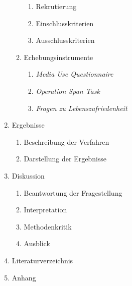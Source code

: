 \begin{enumerate}
\begin{enumerate}
\begin{enumerate}
            \item Rekrutierung
            \item Einschlusskriterien
            \item Ausschlusskriterien
        \end{enumerate}    
        \item Erhebungsinstrumente
        \begin{enumerate}
            \item \textit{Media Use Questionnaire}
            \item \textit{Operation Span Task}
            \item \textit{Fragen zu Lebenszufriedenheit}
        \end{enumerate}
    \end{enumerate}
    \item Ergebnisse
    \begin{enumerate}
        \item Beschreibung der Verfahren 
        \item Darstellung der Ergebnisse
    \end{enumerate}
    \item Diskussion
    \begin{enumerate}
        \item Beantwortung der Fragestellung
        \item Interpretation
        \item Methodenkritik
        \item Ausblick
    \end{enumerate}
    \item Literaturverzeichnis
    \item Anhang
\end{enumerate}
